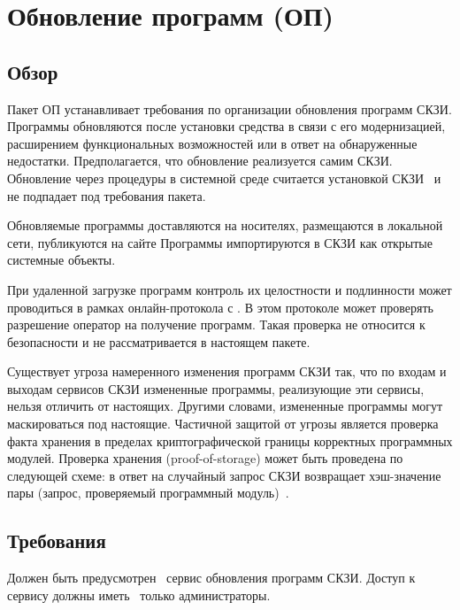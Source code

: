 \section{Обновление программ (ОП)}\label{SU}

\subsection{Обзор}\label{SU.Intro}

Пакет ОП устанавливает требования по организации обновления программ СКЗИ.
Программы обновляются после установки средства в связи с его модернизацией, 
расширением функциональных возможностей или в ответ на обнаруженные недостатки.
%
Предполагается, что обновление реализуется самим СКЗИ. Обновление через 
процедуры в системной среде считается установкой СКЗИ~ 
и не подпадает под требования пакета.

Обновляемые программы доставляются на  носителях,
размещаются в локальной сети, публикуются на сайте 
%
Программы импортируются в СКЗИ как открытые системные объекты.

При удаленной загрузке программ контроль их целостности и подлинности 
может проводиться в рамках онлайн-протокола с . 
В этом протоколе  может проверять разрешение 
оператор на получение программ. Такая проверка не относится к 
безопасности и не рассматривается в настоящем пакете.

Существует угроза намеренного изменения программ СКЗИ так, что по
входам и выходам сервисов СКЗИ измененные программы, реализующие эти сервисы, 
нельзя отличить от настоящих. Другими словами, измененные программы могут 
маскироваться под настоящие. Частичной защитой от угрозы является проверка 
факта хранения в пределах криптографической границы корректных программных 
модулей. Проверка хранения (proof-of-storage) может быть проведена по следующей 
схеме: в ответ на случайный запрос СКЗИ возвращает хэш-значение пары (запрос, 
проверяемый программный модуль)~.

\subsection{Требования}\label{SU.Reqs}

\label{R.SU.Service}
Должен быть предусмотрен~ сервис обновления 
программ СКЗИ. Доступ к сервису должны иметь~ 
только администраторы.

